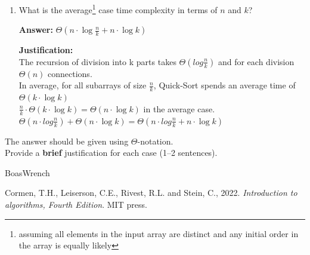 \documentclass[dvipsnames]{article}
\begin{document}
\begin{enumerate}
\begin{enumerate}
      \color{blue}
      \textbf{Answer:} $\Theta(n)$\\
      \textbf{Justification:} \\
      If our array is already sorted and we won't actually apply Merge-Sort when $n=k$:\\
     For Bucket-Sort, we will write, then if each bucket contains only one element, then Quick-Sort will be performed for all element in $\Theta(1) \cdot n = \Theta(n)$. Next, we assemble it into a new sorted array in $\Theta(n)$ time.\\
        $\Theta(n \cdot log \frac{n}{n}) + \Theta(n)=\Theta(n)$
      \color{black}

      \item What is the average\footnote{assuming all elements in the input array are distinct and any initial order in the array is equally likely} case time complexity in terms of $n$ and $k$?

      \color{blue}
      \textbf{Answer:} $\Theta(n \cdot \log \frac{n}{k} + n \cdot \log k)$

      \textbf{Justification:} \\
       The recursion of division into k parts takes $\Theta(log \frac{n}{k})$ and for each division $\Theta(n)$ connections.\\
       In average, for all subarrays of size $\frac{n}{k}$, Quick-Sort spends an average time of $\Theta(k \cdot \log k)$\\
        $\frac{n}{k} \cdot \Theta(k \cdot \log k) = \Theta(n \cdot \log k)$ in the average case.\\
        $\Theta(n \cdot log \frac{n}{k}) + \Theta(n \cdot \log k)=\Theta(n \cdot log \frac{n}{k}+n \cdot \log k)$
      \color{black}
      \color{black}
    \end{enumerate}
  The answer should be given using $\Theta$-notation. \\
  Provide a \textbf{brief} justification for each case (1--2 sentences).

\end{enumerate}

\begin{thebibliography}{BoasWrench}

Cormen, T.H., Leiserson, C.E., Rivest, R.L. and Stein, C., 2022. \emph{Introduction to algorithms, Fourth Edition}. MIT press.

\end{thebibliography}
\end{document}
